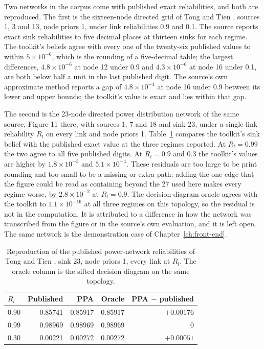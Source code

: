 \documentclass[12pt]{report}
\begin{document}
Two networks in the corpus come with published exact reliabilities, and both are reproduced.
The first is the sixteen-node directed grid of Tong and Tien \cite{tong2019directed}, sources
1, 3 and 13, node priors 1, under link reliabilities 0.9 and 0.1. The source reports exact
sink reliabilities to five decimal places at thirteen sinks for each regime. The toolkit's
beliefs agree with every one of the twenty-six published values to within
$5 \times 10^{-6}$, which is the rounding of a five-decimal table; the largest differences,
$4.8 \times 10^{-6}$ at node 12 under 0.9 and $4.3 \times 10^{-6}$ at node 16 under 0.1, are
both below half a unit in the last published digit. The source's own approximate method
reports a gap of $4.8 \times 10^{-4}$ at node 16 under 0.9 between its lower and upper
bounds; the toolkit's value is exact and lies within that gap.

The second is the 23-node directed power distribution network of the same source, Figure 11
there, with sources 1, 7 and 18 and sink 23, under a single link reliability $R_l$ on every
link and node priors 1. Table~\ref{tab:pp-power-repro} compares the toolkit's sink belief with
the published exact value at the three regimes reported. At $R_l = 0.99$ the two agree to all
five published digits. At $R_l = 0.9$ and $0.3$ the toolkit's values are higher by
$1.8 \times 10^{-3}$ and $5.1 \times 10^{-4}$. These residuals are too large to be print
rounding and too small to be a missing or extra path: adding the one edge that the figure
could be read as containing beyond the 27 used here makes every regime worse, by
$2.8 \times 10^{-2}$ at $R_l = 0.9$. The decision-diagram oracle agrees with the toolkit to
$1.1 \times 10^{-16}$ at all three regimes on this topology, so the residual is not in the
computation. It is attributed to a difference in how the network was transcribed from the
figure or in the source's own evaluation, and it is left open. The same network is the
demonstration case of Chapter~\ref{ch:front-end}.

\begin{table}[htbp]
\centering
\caption{Reproduction of the published power-network reliabilities of Tong and Tien
\cite{tong2019directed}, sink 23, node priors 1, every link at $R_l$. The oracle column is
the sifted decision diagram on the same topology.}
\label{tab:pp-power-repro}
\small
\renewcommand{\arraystretch}{1.15}
\begin{tabular}{lrrrr}
\toprule
$R_l$ & Published & PPA & Oracle & PPA $-$ published \\
\midrule
0.90 & 0.85741 & 0.85917 & 0.85917 & $+0.00176$ \\
0.99 & 0.98969 & 0.98969 & 0.98969 & $0$ \\
0.30 & 0.00221 & 0.00272 & 0.00272 & $+0.00051$ \\
\bottomrule
\end{tabular}
\end{table}
\end{document}
